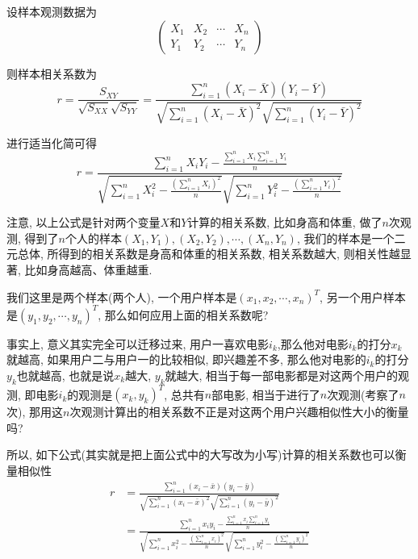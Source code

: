 \documentclass[a4paper,UTF8]{ctexart}
\theoremstyle{plain} \newtheorem{theorem}{定理}[section]
\theoremstyle{plain} \newtheorem{definition}{定义}[section]
\theoremstyle{plain} \newtheorem{lemma}{引理}[section]
\theoremstyle{plain} \newtheorem{proposition}{命题}[section]
\theoremstyle{plain} \newtheorem{example}{例}[section]
\theoremstyle{plain} \newtheorem{remark}{注}[section]
\theoremstyle{plain} \newtheorem{corollary}{推论}[section]
\begin{document}
设样本观测数据为
$$
\begin{pmatrix}
X_{1}  &  X_{2}  &  \cdots  &  X_{n} \\
Y_{1}  &  Y_{2}  &  \cdots  &  Y_{n} 
\end{pmatrix}
$$

则样本相关系数为
\begin{equation*}
r = \frac{S_{XY}}{\sqrt{S_{XX}}\sqrt{S_{YY}}} = \frac{\sum\limits_{i=1}^{n}(X_{i}-\bar{X})(Y_{i} - \bar{Y})}{\sqrt{\sum\limits_{i=1}^{n}(X_{i} - \bar{X})^2}\sqrt{\sum\limits_{i=1}^{n}(Y_{i} - \bar{Y})^2}}
\end{equation*}

进行适当化简可得
\begin{equation*}
r = \frac{\sum\limits_{i=1}^{n}X_{i}Y_{i} - \frac{\sum\limits_{i=1}^{n}X_{i}\sum\limits_{i=1}^{n}Y_{i}}{n}}{\sqrt{\sum\limits_{i=1}^{n}X_{i}^{2} - \frac{\left(\sum\limits_{i=1}^{n}X_{i}\right)^{2}}{n}}\sqrt{\sum\limits_{i=1}^{n}Y_{i}^{2} - \frac{\left(\sum\limits_{i=1}^{n}Y_{i}\right)^{2}}{n}}}
\end{equation*}

注意, 以上公式是针对两个变量$X$和$Y$计算的相关系数, 比如身高和体重, 做了$n$次观测, 得到了$n$个人的样本$(X_1,Y_1),(X_2,Y_2),\cdots,(X_n,Y_n)$, 我们的样本是一个二元总体, 所得到的相关系数是身高和体重的相关系数, 相关系数越大, 则相关性越显著, 比如身高越高、体重越重.

我们这里是两个样本(两个人), 一个用户样本是$(x_1,x_2,\cdots,x_n)^{T}$, 另一个用户样本是$(y_1,y_2,\cdots,y_n)^{T}$, 那么如何应用上面的相关系数呢?

事实上, 意义其实完全可以迁移过来, 用户一喜欢电影$i_{k}$,那么他对电影$i_{k}$的打分$x_{k}$就越高, 如果用户二与用户一的比较相似, 即兴趣差不多, 那么他对电影的$i_{k}$的打分$y_{k}$也就越高, 也就是说$x_{k}$越大, $y_{k}$就越大, 相当于每一部电影都是对这两个用户的观测, 即电影$i_{k}$的观测是$(x_k,y_k)^{T}$, 总共有$n$部电影, 相当于进行了$n$次观测(考察了$n$次), 那用这$n$次观测计算出的相关系数不正是对这两个用户兴趣相似性大小的衡量吗?

所以, 如下公式(其实就是把上面公式中的大写改为小写)计算的相关系数也可以衡量相似性
\begin{align*}
r & =  \frac{\sum\limits_{i=1}^{n}(x_{i}-\bar{x})(y_{i} - \bar{y})}{\sqrt{\sum\limits_{i=1}^{n}(x_{i} - \bar{x})^2}\sqrt{\sum\limits_{i=1}^{n}(y_{i} - \bar{y})^2}} \\ 
& = \frac{\sum\limits_{i=1}^{n}x_{i}y_{i} - \frac{\sum\limits_{i=1}^{n}x_{i}\sum\limits_{i=1}^{n}y_{i}}{n}}{\sqrt{\sum\limits_{i=1}^{n}x_{i}^{2} - \frac{\left(\sum\limits_{i=1}^{n}x_{i}\right)^{2}}{n}}\sqrt{\sum\limits_{i=1}^{n}y_{i}^{2} - \frac{\left(\sum\limits_{i=1}^{n}y_{i}\right)^{2}}{n}}}
\end{align*}
\end{document}
